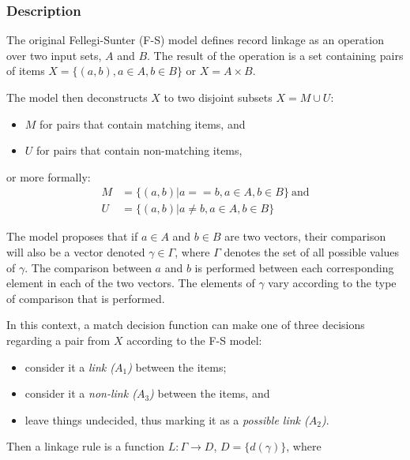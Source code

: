 \documentclass[journal]{IEEEtran}
\begin{document}
    \subsubsection[fsm-desc]{Description}\label{subsubsec:fsm-desc}

    The original Fellegi-Sunter (F-S) model defines record linkage as an operation over two input
    sets, $A$ and $B$.
    The result of the operation is a set containing pairs of items
    $X = \{(a, b), a \in A, b \in B\}$ or $X = A \times B$.
    
    The model then deconstructs $X$ to two disjoint subsets $X = M \cup U$:
    \begin{itemize}
        \item $M$ for pairs that contain matching items, and
        \item $U$ for pairs that contain non-matching items,
    \end{itemize}
    or more formally:
    \begin{align}
        M &= \{(a, b) | a == b, a \in A, b \in B\}~\textrm{and}\nonumber \\
        U &= \{(a, b) | a \neq b, a \in A, b \in B\}\nonumber
    \end{align}

    The model proposes that if $a \in A$ and $b \in B$ are two vectors, their
    comparison will also be a vector denoted $\gamma \in \varGamma$, where
    $\varGamma$ denotes the set of all possible values of $\gamma$.
    The comparison between $a$ and $b$ is performed between each corresponding
    element in each of the two vectors.
    The elements of $\gamma$ vary according to the type of comparison that is
    performed\cite{winkler1990}.

    In this context, a match decision function can make one of three decisions
    regarding a pair from $X$ according to the F-S model:
    
    \begin{itemize}
        \item consider it a \textit{link ($A_1$)} between the items;
        \item consider it a \textit{non-link ($A_3$)} between the items, and
        \item leave things undecided, thus marking it as a \textit{possible link
              ($A_2$)}.
    \end{itemize}
    
    Then a linkage rule is a function $L:\varGamma \rightarrow D$,
    $D=\{d(\gamma)\}$, where
    
\end{document}
